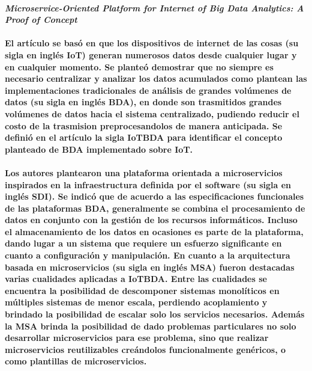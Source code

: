 \paragraph{\textbf{
        \emph{ Microservice-Oriented Platform for Internet of Big Data Analytics: A Proof of Concept }
    } \cite{li_microservice-oriented_2019}}



\paragraph{
    El artículo se basó en que los dispositivos de internet de las cosas (su sigla en inglés IoT) generan numerosos datos desde cualquier lugar y en cualquier momento. Se planteó demostrar que no siempre es necesario centralizar y analizar los datos acumulados como plantean las implementaciones tradicionales de análisis de grandes volúmenes de datos (su sigla en inglés BDA), en donde son trasmitidos grandes volúmenes de datos hacia el sistema centralizado, pudiendo reducir el costo de la trasmision preprocesandolos de manera anticipada. Se definió en el artículo la sigla IoTBDA para identificar el concepto planteado de BDA implementado sobre IoT.
}

\paragraph{
    Los autores plantearon una plataforma orientada a microservicios inspirados en la infraestructura definida por el software (su sigla en inglés SDI).
    Se indicó que de acuerdo a las especificaciones funcionales de las plataformas BDA, generalmente se combina el procesamiento de datos en conjunto con la gestión de los recursos informáticos. Incluso el almacenamiento de los datos en ocasiones es parte de la plataforma, dando lugar a un sistema que requiere un esfuerzo significante en cuanto a configuración y manipulación.
    En cuanto a la arquitectura basada en microservicios (su sigla en inglés MSA) fueron destacadas varias cualidades aplicadas a IoTBDA. Entre las cualidades se encuentra la posibilidad de descomponer sistemas monolíticos en múltiples sistemas de menor escala, perdiendo acoplamiento y brindado la posibilidad de escalar solo los servicios necesarios. Además la MSA brinda la posibilidad de dado problemas particulares no solo desarrollar microservicios para ese problema, sino que realizar microservicios reutilizables creándolos funcionalmente genéricos, o como plantillas de microservicios.
}

